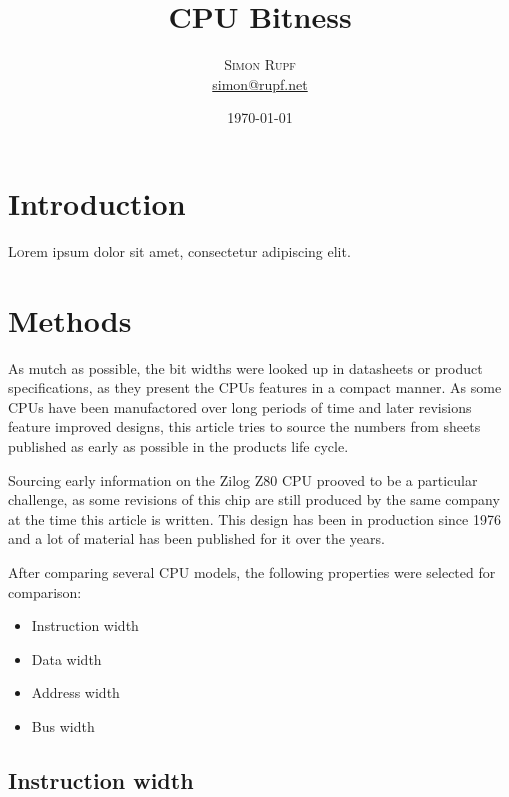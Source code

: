 \documentclass[twoside,twocolumn]{article}
\title{CPU Bitness} %
\author{%
\textsc{Simon Rupf} \\[1ex]
\normalsize \href{mailto:simon@rupf.net}{simon@rupf.net}
}
\date{\today} %
\begin{document}
\maketitle


\section{Introduction}

\lettrine[nindent=0em,lines=3]{L} orem ipsum dolor sit amet, consectetur adipiscing elit.


\section{Methods}

As mutch as possible, the bit widths were looked up in datasheets or product
specifications, as they present the CPUs features in a compact manner. As some CPUs have
been manufactored over long periods of time and later revisions feature improved designs,
this article tries to source the numbers from sheets published as early as possible in
the products life cycle.

Sourcing early information on the Zilog Z80 CPU prooved to be a particular challenge, as
some revisions of this chip are still produced by the same company at the time this
article is written. This design has been in production since 1976 and a lot of material
has been published for it over the years.

After comparing several CPU models, the following properties were selected for comparison:

\begin{itemize}
\item Instruction width
\item Data width
\item Address width
\item Bus width
\end{itemize}

\subsection{Instruction width}
\end{document}
